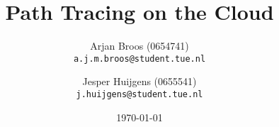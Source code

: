 \title{Path Tracing on the Cloud}
\date{\today}
\author{Arjan Broos (0654741) \\ \texttt{a.j.m.broos@student.tue.nl}
    \and Jesper Huijgens (0655541) \\ \texttt{j.huijgens@student.tue.nl}}
\maketitle
